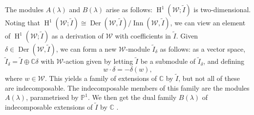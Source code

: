 \documentclass[11pt, svgnames]{amsart}
\newcommand{\CC}{\mathbb{C}}
\newcommand{\PP}{\mathbb{P}}
\newcommand{\W}{\mathcal{W}}
\DeclareMathOperator{\Der}{Der}
\DeclareMathOperator{\Inn}{Inn}
\DeclareMathOperator{\HH}{H}
\theoremstyle{definition}
\begin{document}
The modules $A(\lambda)$ and $B(\lambda)$ arise as follows: $\HH^1(\W; \widetilde{I})$ is two-dimensional. Noting that $\HH^1(\W; \widetilde{I}) \cong \Der(\W,\widetilde{I})/\Inn(\W,\widetilde{I})$, we can view an element of $\HH^1(\W; \widetilde{I})$ as a derivation of $\W$ with coefficients in $\widetilde{I}$. Given $\delta \in \Der(\W,\widetilde{I})$, we can form a new $\W$-module $\widetilde{I}_\delta$ as follows: as a vector space, $\widetilde{I}_\delta = \widetilde{I} \oplus \CC \delta$ with $\W$-action given by letting $\widetilde{I}$ be a submodule of $\widetilde{I}_\delta$, and defining
$$w \cdot \delta = -\delta(w),$$
where $w \in \W$. This yields a family of extensions of $\CC$ by $\widetilde{I}$, but not all of these are indecomposable. The indecomposable members of this family are the modules $A(\lambda)$, parametrised by $\PP^1$. We then get the dual family $B(\lambda)$ of indecomposable extensions of $\widetilde{I}$ by $\CC$ \cite[Remark 3.1]{SierraSpenko}.
\end{document}
